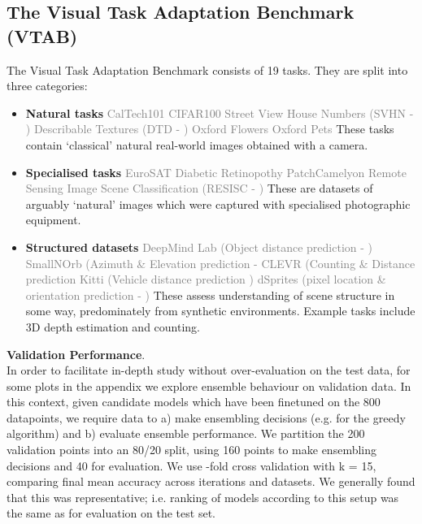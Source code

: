 \documentclass{article} \usepackage{iclr2021_conference,times}
\begin{document}
\subsection{The Visual Task Adaptation Benchmark (VTAB)}
\label{app:vtab}
The Visual Task Adaptation Benchmark consists of 19 tasks. They are split into three categories:
\begin{itemize}
    \item \textbf{Natural tasks}
    \small{\textcolor{gray}{CalTech101 \citep{caltech101}  CIFAR100 \citep{cifar100}  Street View House Numbers (SVHN - \citet{svhn})  Describable Textures (DTD - \citet{dtd})  Oxford Flowers \citep{flowers}  Oxford Pets \citep{pets}}}
    \normalsize These tasks contain `classical' natural real-world images obtained with a camera.
    \item \textbf{Specialised tasks}
    \small{\textcolor{gray}{EuroSAT \citep{eurosat}  Diabetic Retinopothy \citep{retino} PatchCamelyon \citep{camelyon}  Remote Sensing Image Scene Classification (RESISC - \citet{resisc})
    }}
    \normalsize These are datasets of arguably `natural' images which were captured with specialised photographic equipment.
    \item \textbf{Structured datasets}
    \small{\textcolor{gray}{
    DeepMind Lab (Object distance prediction - \citet{zhai2019largescale})  SmallNOrb (Azimuth \& Elevation prediction - \citet{smallnorb} CLEVR (Counting \& Distance prediction \citet{clevr}  Kitti (Vehicle distance prediction \citet{kitti})  dSprites (pixel location \& orientation prediction - \citet{dsprites})
    }}
    \normalsize These assess understanding of scene structure in some way, predominately from synthetic environments. Example tasks include 3D depth estimation and counting.
\end{itemize}

\textbf{Validation Performance}.\\
In order to facilitate in-depth study without over-evaluation on the test data, for some plots in the appendix we explore ensemble behaviour on validation data. In this context, given candidate models which have been finetuned on the 800 datapoints, we require data to a) make ensembling decisions (e.g. for the greedy algorithm) and b) evaluate ensemble performance.
We partition the 200 validation points into an 80/20 split, using 160 points to make ensembling decisions and 40 for evaluation. We use -fold cross validation with k = 15, comparing final mean accuracy across iterations and datasets. We generally found that this was representative; i.e. ranking of models according to this setup was the same as for evaluation on the test set.
\end{document}
